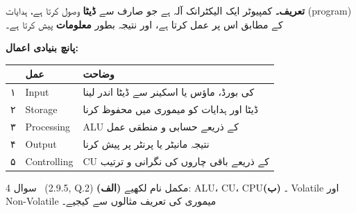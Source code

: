 \begin{hal}
\textbf{تعریف۔} کمپیوٹر ایک الیکٹرانک آلہ ہے جو صارف سے \textbf{ڈیٹا} وصول
کرتا ہے، ہدایات (\textenglish{program}) کے مطابق اس پر عمل کرتا ہے، اور نتیجہ
بطور \textbf{معلومات} پیش کرتا ہے۔

\medskip
\textbf{پانچ بنیادی اعمال:}
\begin{center}
\begin{tabular}{@{}p{1.0cm} p{3.6cm} p{9.4cm}@{}}
\toprule
 & \textbf{عمل} & \textbf{وضاحت} \\
\midrule
۱ & \textenglish{Input}      & کی بورڈ، ماؤس یا اسکینر سے ڈیٹا اندر لینا \\
۲ & \textenglish{Storage}    & ڈیٹا اور ہدایات کو میموری میں محفوظ کرنا \\
۳ & \textenglish{Processing} & \textenglish{ALU} کے ذریعے حسابی و منطقی عمل \\
۴ & \textenglish{Output}     & نتیجہ مانیٹر یا پرنٹر پر پیش کرنا \\
۵ & \textenglish{Controlling}& \textenglish{CU} کے ذریعے باقی چاروں کی نگرانی و ترتیب \\
\bottomrule
\end{tabular}
\end{center}

\end{hal}

\begin{sawal}{سوال \textenglish{4} \ \textnormal{\small(\textenglish{2.9.5, Q.2})}}
\textbf{(الف)} مکمل نام لکھیے: \textenglish{ALU}، \textenglish{CU}،
\textenglish{CPU}۔
\textbf{(ب)} \textenglish{Volatile} اور \textenglish{Non-Volatile} میموری کی
تعریف مثالوں سے کیجیے۔
\end{sawal}

